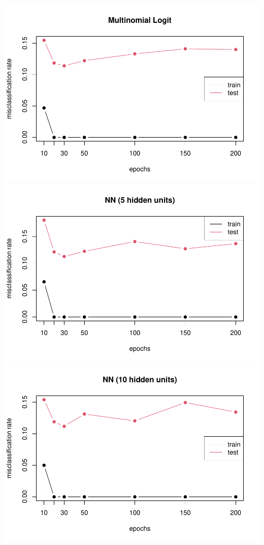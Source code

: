 \documentclass[
]{article}
\begin{document}
\includegraphics{A4_files/figure-latex/unnamed-chunk-10-1.pdf}
\includegraphics{A4_files/figure-latex/unnamed-chunk-10-2.pdf}
\includegraphics{A4_files/figure-latex/unnamed-chunk-10-3.pdf}
\end{document}
